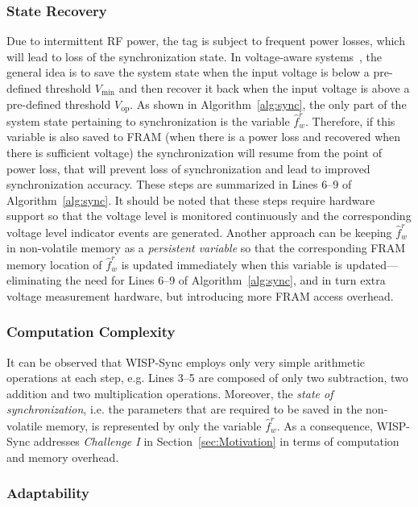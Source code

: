 \documentclass[journal,draftcls,onecolumn,12pt,twoside]{IEEEtranTCOM}
\begin{document}
\subsubsection{State Recovery}

Due to intermittent RF power, the tag is subject to frequent power losses, which will lead to loss of the synchronization state. In voltage-aware systems~\cite{Buettner:2011:Dewdrop,Ransford:2011:Mementos,Lucia:2015:Execution,Colin:2016:Debugger}, the general idea is to save the system state when the input voltage is below a pre-defined threshold $V_{\min}$ and then recover it back when the input voltage is above a pre-defined threshold $V_{\text{op}}$. As shown in Algorithm~\ref{alg:sync}, the only part of the system state pertaining to synchronization is the variable $\hat{f}_w^r$. Therefore, if this variable is also saved to FRAM (when there is a power loss and recovered when there is sufficient voltage) the synchronization will resume from the point of power loss, that will prevent loss of synchronization and lead to improved synchronization accuracy. These steps are summarized in Lines 6--9 of Algorithm~\ref{alg:sync}. It should be noted that these steps require hardware support so that the voltage level is monitored continuously and the corresponding voltage level indicator events are generated. Another approach can be keeping $\hat{f}_w^r$ in non-volatile memory as a \emph{persistent variable} so that the corresponding FRAM memory location of $\hat{f}_w^r$ is updated immediately when this variable is updated---eliminating the need for Lines 6--9 of Algorithm~\ref{alg:sync}, and in turn extra voltage measurement hardware, but introducing more FRAM access overhead.

\subsubsection{Computation Complexity\label{subsec:complexity}}

It can be observed that WISP-Sync employs only very simple arithmetic operations at each step, e.g. Lines 3--5 are composed of only two subtraction, two addition and two multiplication operations. Moreover, the \emph{state of synchronization}, i.e. the parameters that are required to be saved in the non-volatile memory, is represented by only the variable $\hat{f}_w^r$. As a consequence, WISP-Sync addresses \emph{Challenge I} in Section~\ref{sec:Motivation} in terms of computation and memory overhead. 

\subsubsection{Adaptability} 
\label{sec:adaptibility}
\end{document}
